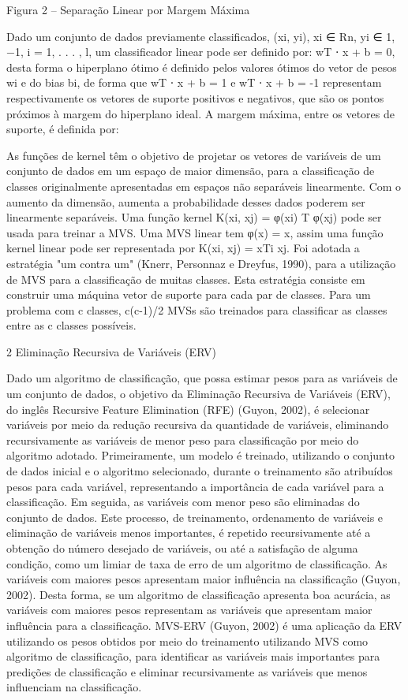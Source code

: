 Figura 2 – Separação Linear por Margem Máxima

Dado um conjunto de dados previamente classificados, (xi, yi), xi ∈ Rn, yi ∈ {1, −1}, i = 1, . . . , l, um classificador linear pode ser definido por: wT ⋅ x + b = 0, desta forma o hiperplano ótimo é definido pelos valores ótimos do vetor de pesos wi e do bias bi, de forma que wT ⋅ x + b = 1 e wT ⋅ x + b = -1 representam respectivamente os vetores de suporte positivos e negativos, que são os pontos próximos à margem do hiperplano ideal. A margem máxima, entre os vetores de suporte, é definida por:

As funções de kernel têm o objetivo de projetar os vetores de variáveis de um conjunto de dados em um espaço de maior dimensão, para a classificação de classes originalmente apresentadas em espaços não separáveis linearmente. Com o aumento da dimensão, aumenta a probabilidade desses dados poderem ser linearmente separáveis. 
Uma função kernel K(xi, xj) = φ(xi) T φ(xj) pode ser usada para treinar a MVS. Uma MVS linear tem φ(x) = x, assim uma função kernel linear pode ser representada por K(xi, xj) = xTi xj.
Foi adotada a estratégia "um contra um" (Knerr, Personnaz e Dreyfus, 1990), para a utilização de MVS para a classificação de muitas classes. Esta estratégia consiste em construir uma máquina vetor de suporte para cada par de classes. Para um problema com c classes, c(c-1)/2 MVSs são treinados para classificar as classes entre as c classes possíveis.

2 Eliminação Recursiva de Variáveis (ERV)

Dado um algoritmo de classificação, que possa estimar pesos para as variáveis de um conjunto de dados, o objetivo da Eliminação Recursiva de Variáveis (ERV), do inglês Recursive Feature Elimination (RFE) (Guyon, 2002), é selecionar variáveis por meio da redução recursiva da quantidade de variáveis, eliminando recursivamente as variáveis de menor peso para classificação por meio do algoritmo adotado. 
Primeiramente, um modelo é treinado, utilizando o conjunto de dados inicial e o algoritmo selecionado, durante o treinamento são atribuídos pesos para cada variável, representando a importância de cada variável para a classificação. Em seguida, as variáveis com menor peso são eliminadas do conjunto de dados. Este processo, de treinamento, ordenamento de variáveis e eliminação de variáveis menos importantes, é repetido recursivamente até a obtenção do número desejado de variáveis, ou até a satisfação de alguma condição, como um limiar de taxa de erro de um algoritmo de classificação.
As variáveis com maiores pesos apresentam maior influência na classificação (Guyon, 2002). Desta forma, se um algoritmo de classificação apresenta boa acurácia, as variáveis com maiores pesos representam as variáveis que apresentam maior influência para a classificação.
MVS-ERV (Guyon, 2002) é uma aplicação da ERV utilizando os pesos obtidos por meio do treinamento utilizando MVS como algoritmo de classificação, para identificar as variáveis mais importantes para predições de classificação e eliminar recursivamente as variáveis que menos influenciam na classificação.

